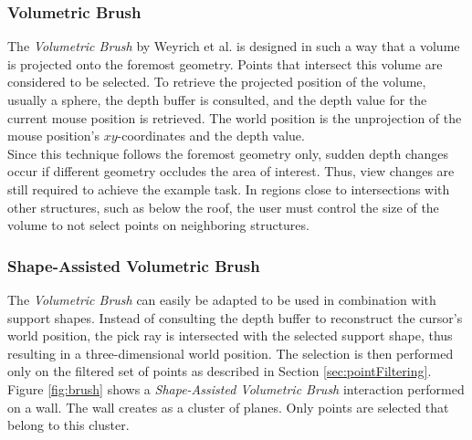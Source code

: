 \subsubsection{Volumetric Brush}

The \textit{Volumetric Brush} by Weyrich et al. \cite{weyrich2004post} is designed in such a way that a volume is projected onto the foremost geometry. Points that intersect this volume are considered to be selected. To retrieve the projected position of the volume, usually a sphere, the depth buffer is consulted, and the depth value for the current mouse position is retrieved. The world position is the unprojection of the mouse position's $xy$-coordinates and the depth value. 
\\
Since this technique follows the foremost geometry only, sudden depth changes occur if different geometry occludes the area of interest. Thus, view changes are still required to achieve the example task. In regions close to intersections with other structures, such as below the roof, the user must control the size of the volume to not select points on neighboring structures. 


\subsubsection{Shape-Assisted Volumetric Brush}

The \textit{Volumetric Brush} can easily be adapted to be used in combination with support shapes. Instead of consulting the depth buffer to reconstruct the cursor’s world position, the pick ray is intersected with the selected support shape, thus resulting in a three-dimensional world position. The selection is then performed only on the filtered set of points as described in Section \ref{sec:pointFiltering}. 
Figure \ref{fig:brush} shows a \textit{Shape-Assisted Volumetric Brush} interaction performed on a wall. The wall creates as a cluster of planes. Only points are selected that belong to this cluster. 

